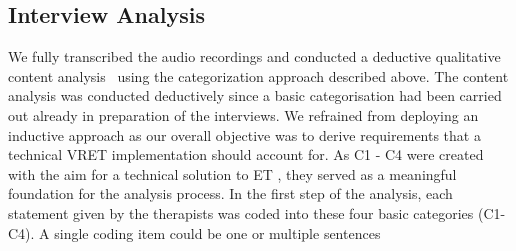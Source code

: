 \subsection{Interview Analysis}
We fully transcribed the audio recordings and conducted a deductive qualitative content analysis~\cite{mayring2000} using the categorization approach described above.
The content analysis was conducted deductively since a basic categorisation had been carried out already in preparation of the interviews. We refrained from deploying an inductive approach as our overall objective was to derive requirements that a technical \ac{VRET} implementation should account for. As C1 - C4 were created with the aim for a technical solution to \ac{ET}%
, they served as a meaningful foundation for the analysis process.
In the first step of the analysis, each statement given by the therapists was coded into these four basic categories (C1{-}C4). A single coding item could be one or multiple sentences %

